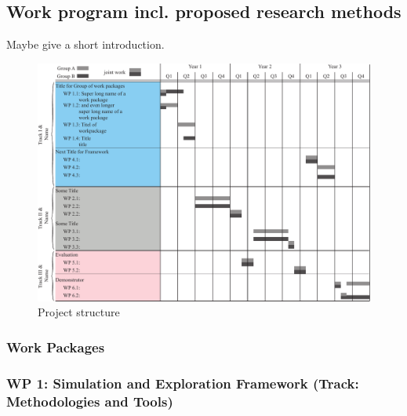 \subsection{Work program incl. proposed research methods}

Maybe give a short introduction.
\begin{figure}[t]
        \centering
	\includegraphics[width=\columnwidth]{figures/workplan}
	\caption{\vspace{-2pt}Project structure}
	\label{fig:project_structure}
	\vspace{-10pt}
\end{figure}


\subsubsection{Work Packages}

\subsubsection*{WP 1: Simulation and Exploration Framework (Track: Methodologies and Tools)} 



